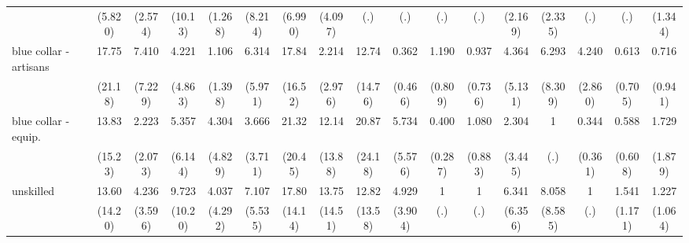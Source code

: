{\begin{tabular}{l*{16}{c}}
                    &     (5.820)         &     (2.574)         &     (10.13)         &     (1.268)         &     (8.214)         &     (6.990)         &     (4.097)         &         (.)         &         (.)         &         (.)         &         (.)         &     (2.169)         &     (2.335)         &         (.)         &         (.)         &     (1.344)         \\
[1em]
blue collar - artisans&       17.75\sym{*}  &       7.410\sym{*}  &       4.221         &       1.106         &       6.314         &       17.84\sym{**} &       2.214         &       12.74\sym{*}  &       0.362         &       1.190         &       0.937         &       4.364         &       6.293         &       4.240\sym{*}  &       0.613         &       0.716         \\
                    &     (21.18)         &     (7.229)         &     (4.863)         &     (1.398)         &     (5.971)         &     (16.52)         &     (2.976)         &     (14.76)         &     (0.466)         &     (0.809)         &     (0.736)         &     (5.131)         &     (8.309)         &     (2.860)         &     (0.705)         &     (0.941)         \\
[1em]
blue collar - equip.&       13.83\sym{*}  &       2.223         &       5.357         &       4.304         &       3.666         &       21.32\sym{**} &       12.14\sym{*}  &       20.87\sym{**} &       5.734         &       0.400         &       1.080         &       2.304         &           1         &       0.344         &       0.588         &       1.729         \\
                    &     (15.23)         &     (2.073)         &     (6.144)         &     (4.829)         &     (3.711)         &     (20.45)         &     (13.88)         &     (24.18)         &     (5.576)         &     (0.287)         &     (0.883)         &     (3.445)         &         (.)         &     (0.361)         &     (0.608)         &     (1.879)         \\
[1em]
unskilled           &       13.60\sym{*}  &       4.236         &       9.723\sym{*}  &       4.037         &       7.107\sym{*}  &       17.80\sym{***}&       13.75\sym{*}  &       12.82\sym{*}  &       4.929\sym{*}  &           1         &           1         &       6.341         &       8.058         &           1         &       1.541         &       1.227         \\
                    &     (14.20)         &     (3.596)         &     (10.20)         &     (4.292)         &     (5.535)         &     (14.14)         &     (14.51)         &     (13.58)         &     (3.904)         &         (.)         &         (.)         &     (6.356)         &     (8.585)         &         (.)         &     (1.171)         &     (1.064)         \\

\end{tabular}}
